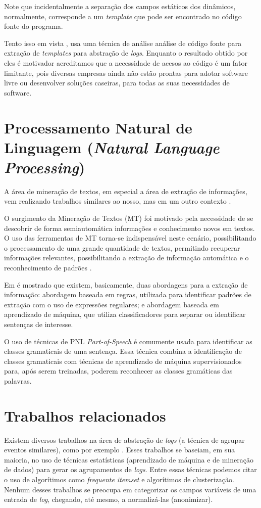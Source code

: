 \documentclass[
	12pt,				%
	openright,			%
	twoside,			%
	a4paper,			%
	english,			%
	spanish,			%
	brazil,				%
	]{abntex2}
\begin{document}
Note que incidentalmente a separação dos campos estáticos dos dinâmicos, normalmente, corresponde a um \emph{template} que pode ser encontrado no código fonte do programa. 

Tento isso em vista \cite{xu2009detecting}, usa uma técnica de análise análise de código fonte para extração de \emph{templates} para abstração de \emph{logs}. Enquanto o resultado obtido por eles é motivador acreditamos que a necessidade de acesos ao código é um fator limitante, pois diversas empresas ainda não estão prontas para adotar software livre ou desenvolver soluções caseiras, para todas as suas necessidades de software.

\section{Processamento Natural de Linguagem (\emph{Natural Language Processing})}
A área de mineração de textos, em especial a área de extração de informações, vem realizando trabalhos similares ao nosso, mas em um outro contexto \cite{duque2012processo, matos2010environment}.

O surgimento da Mineração de Textos (MT) foi motivado pela necessidade de se descobrir de forma semiautomática informações e conhecimento novos em textos. O uso das ferramentas de MT torna-se indispensável neste cenário, possibilitando o processamento de uma grande quantidade de textos, permitindo recuperar informações relevantes, possibilitando a extração de informação automática e o reconhecimento de padrões \cite{duque2012processo}.

Em \cite{duque2012processo} é mostrado que existem, basicamente, duas abordagens para a extração de informação: abordagem baseada em regras, utilizada para identificar padrões de extração com o uso de expressões regulares; e abordagem baseada em aprendizado de máquina, que utiliza classificadores para separar ou identificar sentenças de interesse.

O uso de técnicas de PNL \emph{Part-of-Speech} é comumente usada para identificar as classes gramaticais de uma sentença. Essa técnica combina a identificação de classes gramaticais com técnicas de aprendizado de máquina supervisionados para, após serem treinadas, poderem reconhecer as classes gramáticas das palavras.

\section{Trabalhos relacionados}
Existem diversos trabalhos na área de abstração de \emph{logs} (a técnica de agrupar eventos similares), como por exemplo \cite{jian2008automated, nagappan2010abstracting, vaarandi2003data}. Esses trabalhos se baseiam, em sua maioria, no uso de técnicas estatísticas (aprendizado de máquina e de mineração de dados) para gerar os agrupamentos de \emph{logs}. Entre essas técnicas podemos citar o uso de algorítimos como \emph{frequente itemset} e algorítimos de clusterização. Nenhum desses trabalhos se preocupa em categorizar os campos variáveis de uma entrada de \emph{log}, chegando, até mesmo, a normalizá-las (anonimizar).
\end{document}
